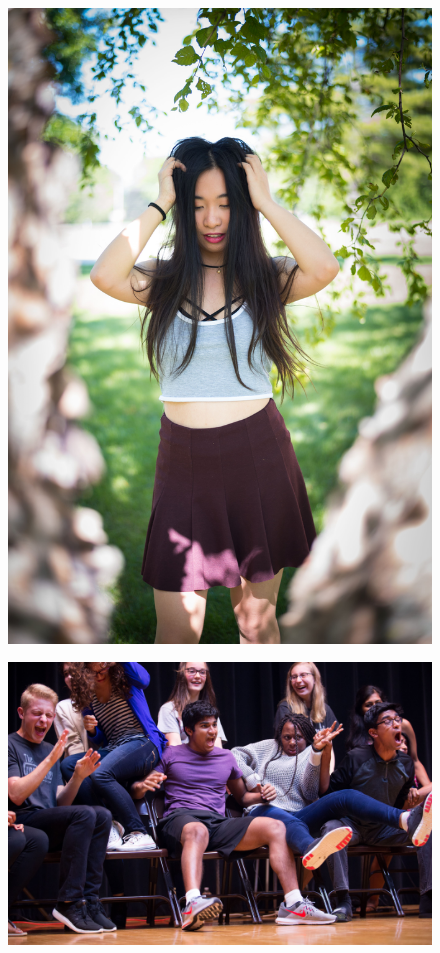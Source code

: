 \documentclass{report}
\begin{document}
\begin{figure}
  \centering
  \includegraphics[width=\textwidth]{res/port_felicia.jpg}
\end{figure}

\begin{landscape}
  \begin{figure}
    \centering
    \includegraphics[height=\textheight]{res/event_hypnotist.jpg}
  \end{figure}
\end{landscape}
\end{document}
